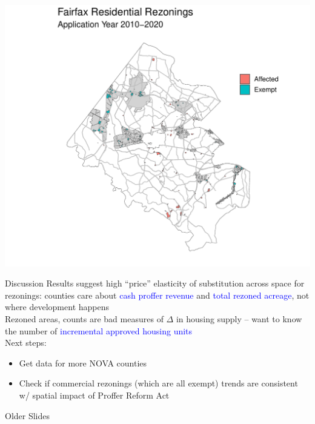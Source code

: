 \documentclass[10pt]{beamer}
\begin{document}
\begin{frame}
    \centering
    \includegraphics[width=\textwidth, height = \textheight]{figures/fairfax/map_fairfax_2010-2020.pdf}
\end{frame}

\begin{frame}{Discussion}
    Results suggest high ``price'' elasticity of substitution across space for rezonings: counties care about \textcolor{blue}{cash proffer revenue} and \textcolor{blue}{total rezoned acreage}, not where development happens \\
    \vspace{2em}
    Rezoned areas, counts are bad measures of $\Delta$ in housing supply -- want to know the number of \textcolor{blue}{incremental approved housing units} \\
    \vspace{2em}
    Next steps:
    \begin{itemize}
        \item Get data for more NOVA counties
        \item Check if commercial rezonings (which are all exempt) trends are consistent w/ spatial impact of Proffer Reform Act
    \end{itemize}
\end{frame}

\begin{frame}
    \large{Older Slides}
\end{frame}
\end{document}
